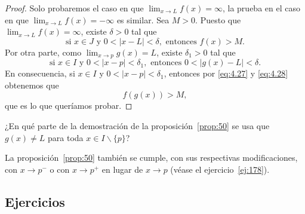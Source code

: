 \documentclass[12pt,a4paper]{book}
\begin{document}
    \begin{proof}
        Solo probaremos el caso en que $\lim_{x\to L}f(x)=\infty$, la prueba
        en el caso en que $\lim_{x\to L}f(x)=-\infty$ es similar. Sea $M>0$. Puesto que
        $\lim_{x\to L}f(x)=\infty$, existe $\delta>0$ tal que
        \begin{equation}\label{eq:4.27}
            \text{si }x\in J\text{ y }0<|x-L|<\delta,\text{ entonces }f(x)>M.
        \end{equation}
        Por otra parte, como $\lim_{x\to p}g(x)=L$, existe $\delta_{1}>0$ tal que
        \begin{equation}\label{eq:4.28}
            \text{si }x\in I\text{ y }0<|x-p|<\delta_{1},\text{ entonces }0<|g(x)-L|<\delta.
        \end{equation}
        En consecuencia, si $x\in I$ y $0<|x-p|<\delta_{1}$, entonces por \eqref{eq:4.27} y \eqref{eq:4.28}
        obtenemos que
        \begin{equation*}
            f(g(x))>M,
        \end{equation*}
        que es lo que queríamos probar.
    \end{proof}

    ¿En qué parte de la demostración de la proposición~\ref{prop:50} se usa que $g(x)\neq L$
    para toda $x\in I\backslash\{p\}$?

    La proposición~\ref{prop:50} también se cumple, con sus respectivas modificaciones,
    con $x\to p^{-}$ o con $x\to p^{+}$ en lugar de $x\to p$ (véase el ejercicio~\ref{ej:178}).

    \par{}\subsection*{Ejercicios}
\end{document}
